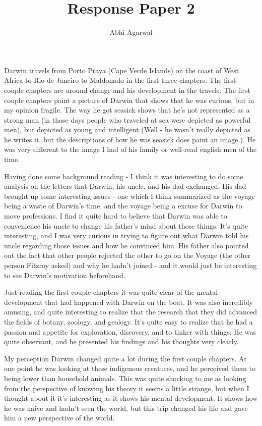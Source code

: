 \documentclass[11pt, oneside]{article}   	%
\title{Response Paper 2}
\author{Abhi Agarwal}
\date{}
\begin{document}
\maketitle

\par Darwin travels from Porto Praya (Cape Verde Islands) on the coast of West Africa to Rio de Janeiro to Maldonado in the first three chapters. The first couple chapters are around change and his development in the travels. The first couple chapters paint a picture of Darwin that shows that he was curious, but in my opinion fragile. The way he got seasick shows that he's not represented as a strong man (in those days people who traveled at sea were depicted as powerful men), but depicted as young and intelligent (Well - he wasn't really depicted as he writes it, but the descriptions of how he was seasick does paint an image.). He was very different to the image I had of his family or well-read english men of the time.

\par Having done some background reading - I think it was interesting to do some analysis on the letters that Darwin, his uncle, and his dad exchanged. His dad brought up some interesting issues - one which I think summarized as the voyage being a waste of Darwin's time, and the voyage being a excuse for Darwin to move professions. I find it quite hard to believe that Darwin was able to convenience his uncle to change his father's mind about those things. It's quite interesting, and I was very curious in trying to figure out what Darwin told his uncle regarding those issues and how he convinced him. His father also pointed out the fact that other people rejected the other to go on the Voyage (the other person Fitzroy asked) and why he hadn't joined - and it would just be interesting to see Darwin's motivation beforehand.

\par Just reading the first couple chapters it was quite clear of the mental development that had happened with Darwin on the boat. It was also incredibly amusing, and quite interesting to realize that the research that they did advanced the fields of botany, zoology, and geology. It's quite easy to realize that he had a passion and appetite for exploration, discovery, and to tinker with things. He was quite observant, and he presented his findings and his thoughts very clearly. 

\par My perception Darwin changed quite a lot during the first couple chapters. At one point he was looking at these indigenous creatures, and he perceived them to being lower than household animals. This was quite shocking to me as looking from the perspective of knowing his theory it seems a little strange, but when I thought about it it's interesting as it shows his mental development. It shows how he was naive and hadn't seen the world, but this trip changed his life and gave him a new perspective of the world.
\end{document}
